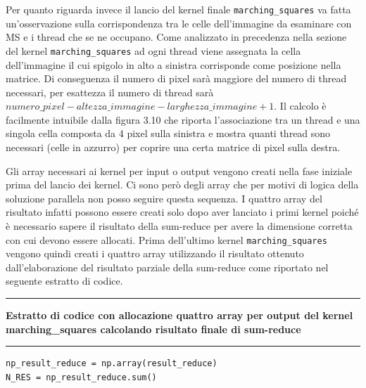 \documentclass[12pt,a4paper]{report}
\begin{document}
{\newpage
Per quanto riguarda invece il lancio del kernel finale \verb|marching_squares| va fatta un'osservazione sulla corrispondenza tra le celle dell'immagine da esaminare con MS e i thread che se ne occupano. Come analizzato in precedenza nella sezione del kernel \verb|marching_squares| ad ogni thread viene assegnata la cella dell'immagine il cui spigolo in alto a sinistra corrisponde come posizione nella matrice. Di conseguenza il numero di pixel sarà maggiore del numero di thread necessari, per esattezza il numero di thread sarà $numero\_pixel - altezza\_immagine - larghezza\_immagine + 1$. Il calcolo è facilmente intuibile dalla figura 3.10 che riporta l'associazione tra un thread e una singola cella composta da 4 pixel sulla sinistra e mostra quanti thread sono necessari (celle in azzurro) per coprire una certa matrice di pixel sulla destra.

\begin{figure}[H]
\centering
\begin{floatrow}[1]
\end{floatrow}
\end{figure} 
\newpage
Gli array necessari ai kernel per input o output vengono creati nella fase iniziale prima del lancio dei kernel. Ci sono però degli array che per motivi di logica della soluzione parallela non posso seguire questa sequenza. I quattro array del risultato infatti possono essere creati solo dopo aver lanciato i primi kernel poiché è necessario sapere il risultato della sum-reduce per avere la dimensione corretta con cui devono essere allocati.
Prima dell'ultimo kernel \verb|marching_squares| vengono quindi creati i quattro array utilizzando il risultato ottenuto dall'elaborazione del risultato parziale della sum-reduce come riportato nel seguente estratto di codice. \\
\noindent\rule[0.5ex]{\linewidth}{2pt}
\small{\textbf{Estratto di codice con allocazione quattro array per output del kernel marching\_squares calcolando risultato finale di sum-reduce}} \\
\noindent\rule[0.5ex]{\linewidth}{1pt}
\begin{lstlisting}
np_result_reduce = np.array(result_reduce) 
N_RES = np_result_reduce.sum() 


\end{lstlisting}}
\end{document}
